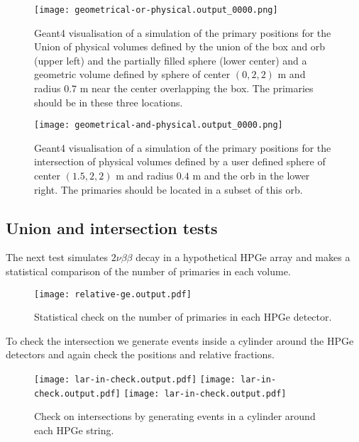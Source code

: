 \begin{figure}[h!]
    \centering
    \texttt{[image: geometrical-or-physical.output\_0000.png]}
    \caption{Geant4 visualisation of a simulation of the primary positions for the Union of physical volumes defined
    by the union of the box and orb (upper left) and the partially filled sphere (lower center) and a geometric volume defined by
    sphere of center $(0,2,2)$ m and radius $0.7$ m near the center overlapping the box.
    The primaries should be in these three locations.}
\end{figure}


\begin{figure}[h!]
    \centering
    \texttt{[image: geometrical-and-physical.output\_0000.png]}
    \caption{Geant4 visualisation of a simulation of the primary positions for the intersection of
    physical volumes defined by a user defined sphere of center $(1.5,2,2)$ m and radius $0.4$ m and the orb in the lower right.
    The primaries should be located in a subset of this orb.}
\end{figure}


\subsection{Union and intersection tests}
The next test simulates $2\nu\beta\beta$ decay in a hypothetical HPGe array and makes a
statistical comparison of the number of primaries in each volume.

\begin{figure}[h!]
    \centering
    \texttt{[image: relative-ge.output.pdf]}
    \caption{Statistical check on the number of primaries in each HPGe detector.}
\end{figure}


To check the intersection we generate events inside a cylinder around the HPGe detectors and again check the
positions and relative fractions.

\begin{figure}[h!]
    \centering
    \texttt{[image: lar-in-check.output.pdf]}
    \texttt{[image: lar-in-check.output.pdf]}
    \texttt{[image: lar-in-check.output.pdf]}
    \caption{Check on intersections by generating events in a cylinder around each HPGe string.}
\end{figure}

